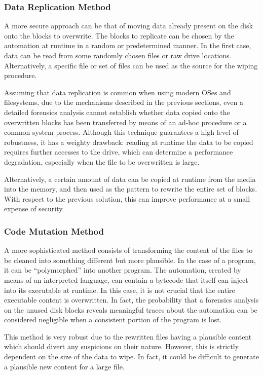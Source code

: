 \documentclass[10pt, conference, compsocconf]{IEEEtran}
\begin{document}
\subsubsection{Data Replication Method}
A more secure approach can be that of moving data already present on the disk onto the blocks to overwrite. The blocks to replicate can be chosen by the automation at runtime in a random or predetermined manner. In the first case, data can be read from some randomly chosen files or raw drive locations. Alternatively, a specific file or set of files can be used as the source for the wiping procedure.

\noindent Assuming that data replication is common when using modern OSes and filesystems, due to the mechanisms described in the previous sections, even a detailed forensics analysis cannot establish whether data copied onto the overwritten blocks has been transferred by means of an ad-hoc procedure or a common system process. Although this technique guarantees a high level of robustness, it has a weighty drawback: reading at runtime the data to be copied requires further accesses to the drive, which can determine a performance degradation, especially when the file to be overwritten is large.

\noindent Alternatively, a certain amount of data can be copied at runtime from the media into the memory, and then used as the pattern to rewrite the entire set of blocks. With respect to the previous solution, this can improve performance at a small expense of security.

\subsubsection{Code Mutation Method}
A more sophisticated method consists of transforming the content of the files to be cleaned into something different but more plausible.
In the case of a program, it can be ``polymorphed'' into another program. The automation, created by means of an interpreted language, can contain a bytecode that itself can inject into its executable at runtime. In this case, it is not crucial that the entire executable content is overwritten. In fact, the probability that a forensics analysis on the unused disk blocks reveals meaningful traces about the automation can be considered negligible when a consistent portion of the program is lost.

\noindent This method is very robust due to the rewritten files having a plausible content which should divert any suspicions on their nature. However, this is strictly dependent on the size of the data to wipe. In fact, it could be difficult to generate a plausible new content for a large file.
\end{document}
